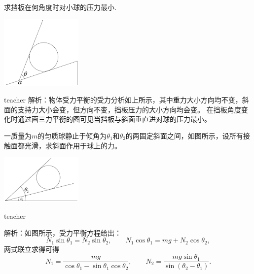 \begin{example}

求挡板在何角度时对小球的压力最小.
\begin{flushright}
\includegraphics[width = 0.3\textwidth]{images/static-force-7.pdf} 
\end{flushright}
\begin{taggedblock}{teacher}
\noindent
解析：物体受力平衡的受力分析如上所示，其中重力大小方向均不变，斜面的支持力大小会变，但方向不变，挡板压力的大小方向均会变。
在挡板角度变化时通过画三力平衡的图可见当挡板与斜面垂直进对球的压力最小。
\end{taggedblock}
\end{example}


\begin{example}
一质量为$m$的匀质球静止于倾角为$\theta_1$和$\theta_2$的两固定斜面之间，如图所示，设所有接触面都光滑，求斜面作用于球上的力。
\begin{flushright}
\includegraphics[width = 0.3\textwidth]{images/static-force-13.pdf} 
\end{flushright}

\begin{taggedblock}{teacher}

\vspace*{2cm}
\noindent
解析：如图所示，受力平衡方程给出：
\[N_1\sin\theta_1 = N_2\sin\theta_2,\qquad N_1\cos\theta_1 = mg+N_2\cos\theta_2,\]
两式联立求得可得
\[
N_1 = \frac{mg}{\cos\theta_1-\sin\theta_1\cos\theta_2},\qquad N_2 = \frac{mg\sin\theta_1}{\sin(\theta_2-\theta_1)}.
\]
\end{taggedblock}
\end{example}





